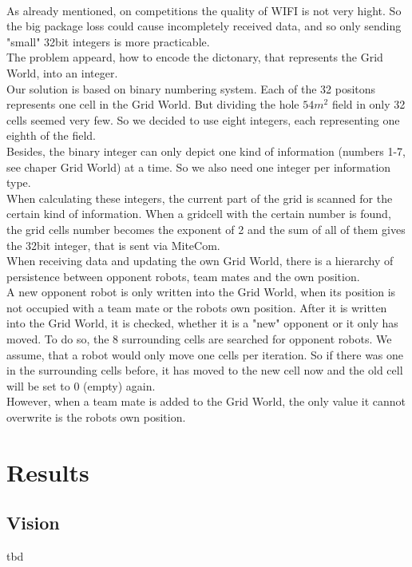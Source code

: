 \documentclass[lnicst,a4paper]{svmultln}
\begin{document}
\\
As already mentioned, on competitions the quality of WIFI is not very hight. So the big package loss could cause incompletely received data, and so only sending "small" 32bit integers is more practicable. 
\\
The problem appeard, how to encode the dictonary, that represents the Grid World, into an integer.
\\
Our solution is based on binary numbering system. Each of the 32 positons represents one cell in the Grid World. But dividing the hole $54m^2$ field in only 32 cells seemed very few. So we decided to use eight integers, each representing one eighth of the field.
\\
Besides, the binary integer can only depict one kind of information (numbers 1-7, see chaper Grid World) at a time. So we also need one integer per information type.
\\
When calculating these integers, the current part of the grid is scanned for the certain kind of information. When a gridcell with the certain number is found, the grid cells number becomes the exponent of 2 and the sum of all of them gives the 32bit integer, that is sent via MiteCom.
\\
When receiving data and updating the own Grid World, there is a hierarchy of persistence between opponent robots, team mates and the own position. 
\\
A new opponent robot is only written into the Grid World, when its position is not occupied with a team mate or the robots own position. After it is written into the Grid World, it is checked, whether it is a "new" opponent or it only has moved. To do so, the 8 surrounding cells are searched for opponent robots. We assume, that a robot would only move one cells per iteration. So if there was one in the surrounding cells before, it has moved to the new cell now and the old cell will be set to 0 (empty) again.
\\
However, when a team mate is added to the Grid World, the only value it cannot overwrite is the robots own position.


\section{Results}

\subsection{Vision}
\label{sec:results_vision}
tbd
\end{document}
